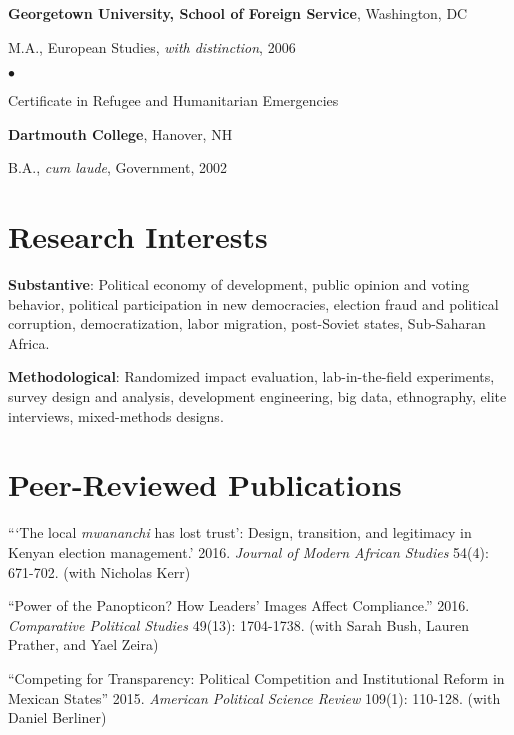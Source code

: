 \documentclass[margin,line]{res}
\newenvironment{list1}{
  \begin{list}{\ding{113}}{%
      \setlength{\itemsep}{0in}
      \setlength{\parsep}{0in} \setlength{\parskip}{0in}
      \setlength{\topsep}{0in} \setlength{\partopsep}{0in} 
      \setlength{\leftmargin}{0.17in}}}{\end{list}}
\newenvironment{list2}{
  \begin{list}{$\bullet$}{%
      \setlength{\itemsep}{0in}
      \setlength{\parsep}{0in} \setlength{\parskip}{0in}
      \setlength{\topsep}{0in} \setlength{\partopsep}{0in} 
      \setlength{\leftmargin}{0.2in}}}{\end{list}}
\begin{document}
{\begin{resume}
{\bf Georgetown University, School of Foreign Service}, Washington, DC \\
\vspace*{-.1in}
\begin{list1}
\item[] M.A., European Studies, \emph{with distinction},  2006
  \begin{list2}
\item[] Certificate in Refugee and Humanitarian Emergencies

\end{list2}
\end{list1}

{\bf Dartmouth College}, Hanover, NH\\
\vspace*{-.1in}
\begin{list1}
\item[] B.A., \emph{cum laude}, Government,  2002
\end{list1}

\section{\sc Research Interests}
\textbf{Substantive}: Political economy of development, public opinion
and voting behavior, political participation in new
democracies, election fraud and
political corruption, democratization,  labor migration, post-Soviet states, Sub-Saharan Africa.

\textbf{Methodological}: Randomized impact evaluation,
lab-in-the-field experiments, survey design and analysis, development engineering, big data, ethnography, elite
interviews, mixed-methods designs.

\section{\sc Peer-Reviewed Publications}
 ``‘The local
  \emph{mwananchi} has lost trust’: Design, transition, and legitimacy
  in Kenyan election management.' 2016. \emph{Journal of Modern African
    Studies} 54(4): 671-702. (with Nicholas Kerr)

``Power of the Panopticon? How Leaders' Images Affect
Compliance.'' 2016.
\emph{Comparative Political Studies} 49(13): 1704-1738. (with Sarah Bush, Lauren Prather, and Yael
Zeira)

``Competing for
Transparency: Political Competition and Institutional Reform in
Mexican States'' 2015. \emph{American Political Science Review}
109(1): 110-128. (with Daniel Berliner)


\end{resume}}
\end{document}
